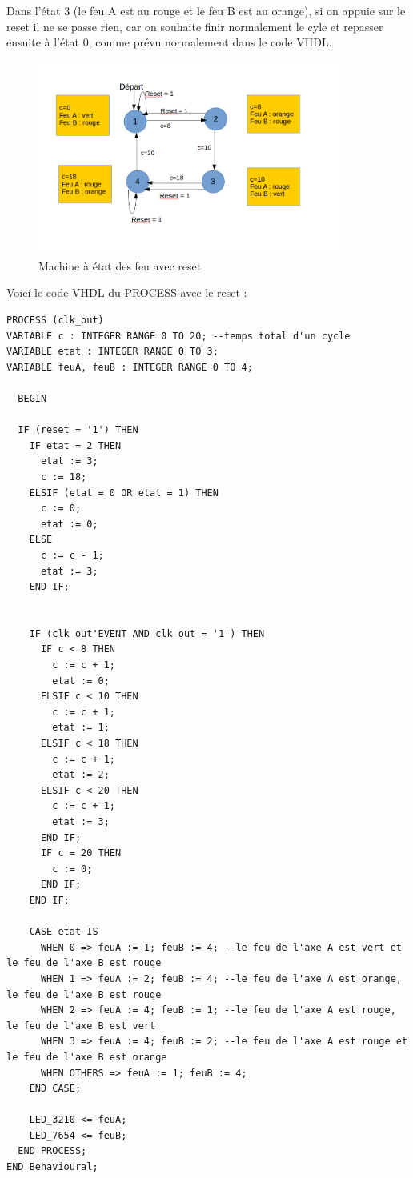 \documentclass[11pt]{report}
\begin{document}
Dans l'état 3 (le feu A est au rouge et le feu B est au orange), si on appuie sur le reset il ne se passe rien, car on souhaite finir normalement le cyle et repasser ensuite à l'état 0, comme prévu normalement dans le code VHDL.

\begin{figure}[h]
\includegraphics[width=10cm]{TP03-2.png}
\caption{Machine à état des feu avec reset}
\end{figure}

\medskip

Voici le code VHDL du PROCESS avec le reset :
\begin{lstlisting}
PROCESS (clk_out)
VARIABLE c : INTEGER RANGE 0 TO 20; --temps total d'un cycle
VARIABLE etat : INTEGER RANGE 0 TO 3;
VARIABLE feuA, feuB : INTEGER RANGE 0 TO 4;

  BEGIN

  IF (reset = '1') THEN
    IF etat = 2 THEN
      etat := 3;
      c := 18;
    ELSIF (etat = 0 OR etat = 1) THEN
      c := 0;
      etat := 0;
    ELSE
      c := c - 1;
      etat := 3;
    END IF;


    IF (clk_out'EVENT AND clk_out = '1') THEN
      IF c < 8 THEN
        c := c + 1;
        etat := 0;
      ELSIF c < 10 THEN
        c := c + 1;
        etat := 1;
      ELSIF c < 18 THEN
        c := c + 1;
        etat := 2;
      ELSIF c < 20 THEN
        c := c + 1;
        etat := 3;
      END IF;
      IF c = 20 THEN
        c := 0;
      END IF;
    END IF;

    CASE etat IS
      WHEN 0 => feuA := 1; feuB := 4; --le feu de l'axe A est vert et le feu de l'axe B est rouge
      WHEN 1 => feuA := 2; feuB := 4; --le feu de l'axe A est orange, le feu de l'axe B est rouge
      WHEN 2 => feuA := 4; feuB := 1; --le feu de l'axe A est rouge, le feu de l'axe B est vert
      WHEN 3 => feuA := 4; feuB := 2; --le feu de l'axe A est rouge et le feu de l'axe B est orange
      WHEN OTHERS => feuA := 1; feuB := 4;
    END CASE;

    LED_3210 <= feuA;
    LED_7654 <= feuB;
  END PROCESS;
END Behavioural;


\end{lstlisting}
\end{document}
